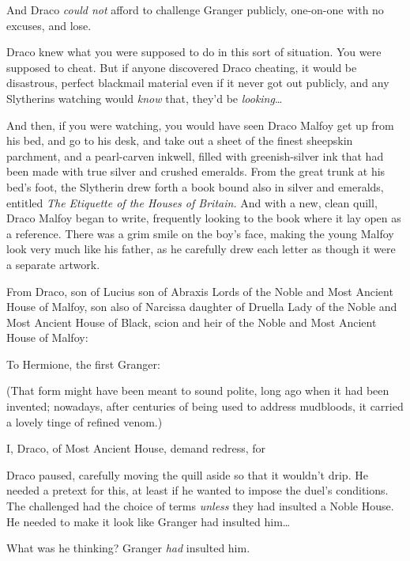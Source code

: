 And Draco \emph{could not} afford to challenge Granger publicly, one-on-one 
with no excuses, and lose.

Draco knew what you were supposed to do in this sort of situation. You were 
supposed to cheat. But if anyone discovered Draco cheating, it would be 
disastrous, perfect blackmail material even if it never got out publicly, and 
any Slytherins watching would \emph{know} that, they'd be \emph{looking}{\ldots}

And then, if you were watching, you would have seen Draco Malfoy get up from 
his bed, and go to his desk, and take out a sheet of the finest sheepskin 
parchment, and a pearl-carven inkwell, filled with greenish-silver ink that had 
been made with true silver and crushed emeralds. From the great trunk at his 
bed's foot, the Slytherin drew forth a book bound also in silver and emeralds, 
entitled \emph{The Etiquette of the Houses of Britain.} And with a new, clean 
quill, Draco Malfoy began to write, frequently looking to the book where it lay 
open as a reference. There was a grim smile on the boy's face, making the young 
Malfoy look very much like his father, as he carefully drew each letter as 
though it were a separate artwork.

\begin{writtenNote}
From Draco, son of Lucius son of Abraxis Lords of the Noble and Most 
Ancient House of Malfoy, son also of Narcissa daughter of Druella Lady of the 
Noble and Most Ancient House of Black, scion and heir of the Noble and Most 
Ancient House of Malfoy:

To Hermione, the first Granger:
\end{writtenNote}

(That form might have been meant to sound polite, long ago when it had been 
invented; nowadays, after centuries of being used to address mudbloods, it 
carried a lovely tinge of refined venom.)

\begin{writtenNote}
I, Draco, of Most Ancient House, demand redress, for
\end{writtenNote}

Draco paused, carefully moving the quill aside so that it wouldn't drip. He 
needed a pretext for this, at least if he wanted to impose the duel's 
conditions. The challenged had the choice of terms \emph{unless} they had 
insulted a Noble House. He needed to make it look like Granger had insulted 
him{\ldots}

What was he thinking? Granger \emph{had} insulted him.

